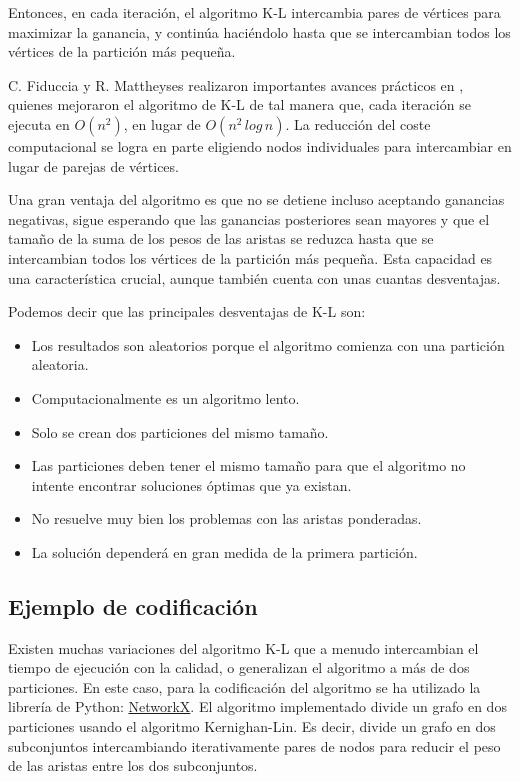 Entonces, en cada iteración, el algoritmo K-L intercambia pares de vértices para maximizar la ganancia, y continúa haciéndolo hasta que se intercambian todos los vértices de la partición más pequeña. 

C. Fiduccia y R. Mattheyses realizaron importantes avances prácticos en \cite{FiducciaMattheyses}, quienes mejoraron el algoritmo de K-L de tal manera que, cada iteración se ejecuta en $O({n}^2)$, en lugar de $O({n}^2 \, log \, n)$. La reducción del coste computacional se logra en parte eligiendo nodos individuales para intercambiar en lugar de parejas de vértices.

Una gran ventaja del algoritmo es que no se detiene incluso aceptando ganancias negativas, sigue esperando que las ganancias posteriores sean mayores y que el tamaño de la suma de los pesos de las aristas se reduzca hasta que se intercambian todos los vértices de la partición más pequeña. Esta capacidad es una característica crucial, aunque también cuenta con unas cuantas desventajas.

Podemos decir que las principales desventajas de K-L son:

\begin{itemize}
	\item Los resultados son aleatorios porque el algoritmo comienza con una partición aleatoria.
	\item Computacionalmente es un algoritmo lento.
	\item Solo se crean dos particiones del mismo tamaño.
	\item Las particiones deben tener el mismo tamaño para que el algoritmo no intente encontrar soluciones óptimas que ya existan.
	\item No resuelve muy bien los problemas con las aristas ponderadas.
	\item La solución dependerá en gran medida de la primera partición.
\end{itemize}

\subsection{Ejemplo de codificación}\label{Kernighan-Lin-ejemplo}

Existen muchas variaciones del algoritmo K-L que a menudo intercambian el tiempo de ejecución con la calidad, o generalizan el algoritmo a más de dos particiones. En este caso, para la codificación del algoritmo se ha utilizado la librería de Python: \href{https://networkx.github.io/documentation/stable/reference/algorithms/generated/networkx.algorithms.community.kernighan_lin.kernighan_lin_bisection.html}{NetworkX}. El algoritmo implementado divide un grafo en dos particiones usando el algoritmo Kernighan-Lin\cite{KernighanLin}. Es decir, divide un grafo en dos subconjuntos intercambiando iterativamente pares de nodos para reducir el peso de las aristas entre los dos subconjuntos.

